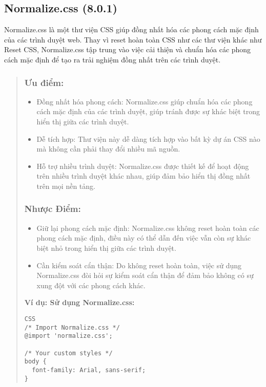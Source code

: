 \subsection{Normalize.css (8.0.1)}

Normalize.css là một thư viện CSS giúp đồng nhất hóa các phong cách mặc định của các trình duyệt web. Thay vì reset hoàn toàn CSS như các thư viện khác như Reset CSS, Normalize.css tập trung vào việc cải thiện và chuẩn hóa các phong cách mặc định để tạo ra trải nghiệm đồng nhất trên các trình duyệt.

\begin{quote}
\subsubsection{Ưu điểm:}
\begin{itemize}
  \item Đồng nhất hóa phong cách: Normalize.css giúp chuẩn hóa các phong cách mặc định của các trình duyệt, giúp tránh được sự khác biệt trong hiển thị giữa các trình duyệt.
  \item Dễ tích hợp: Thư viện này dễ dàng tích hợp vào bất kỳ dự án CSS nào mà không cần phải thay đổi nhiều mã nguồn.
  \item Hỗ trợ nhiều trình duyệt: Normalize.css được thiết kế để hoạt động trên nhiều trình duyệt khác nhau, giúp đảm bảo hiển thị đồng nhất trên mọi nền tảng.
\end{itemize}

\subsubsection{Nhược Điểm:}
\begin{itemize}
  \item Giữ lại phong cách mặc định: Normalize.css không reset hoàn toàn các phong cách mặc định, điều này có thể dẫn đến việc vẫn còn sự khác biệt nhỏ trong hiển thị giữa các trình duyệt.
  \item Cần kiểm soát cẩn thận: Do không reset hoàn toàn, việc sử dụng Normalize.css đòi hỏi sự kiểm soát cẩn thận để đảm bảo không có sự xung đột với các phong cách khác.
\end{itemize}

\textbf{Ví dụ: Sử dụng Normalize.css:}
\begin{lstlisting}
CSS
/* Import Normalize.css */
@import 'normalize.css';

/* Your custom styles */
body {
  font-family: Arial, sans-serif;
}
\end{lstlisting}
\end{quote}


